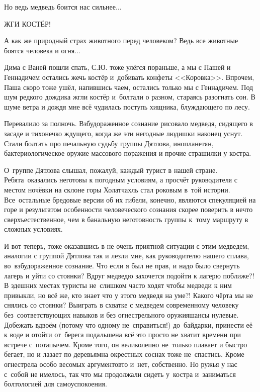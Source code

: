 \diagdash Но ведь медведь боится нас сильнее$\ldots$  

\diagdash ЖГИ КОСТЁР! 

\diagdash А как же природный страх животного перед человеком? Ведь все животные боятся человека и огня$\ldots$  


Дима с Ваней пошли спать, С.Ю. тоже улёгся пораньше, а мы с Пашей и Геннадичем остались жечь костёр и~добивать конфеты <<Коровка>>. Впрочем, Паша скоро тоже ушёл, напившись чаем, остались только мы с Геннадичем. Под шум редкого дождика жгли костёр и~болтали о разном, стараясь разогнать сон. В шуме ветра и дождя мне всё чудилась поступь хищника, блуждающего по лесу. 

Перевалило за полночь. Взбудораженное сознание рисовало медведя, сидящего в засаде и тихонечко ждущего, когда же эти негодные людишки наконец уснут. Стали болтать про печальную судьбу группы Дятлова, инопланетян, бактериологическое оружие массового поражения и прочие страшилки у костра. 

О~группе Дятлова слышал, пожалуй, каждый турист в нашей стране. Ребята~оказались неготовы к погодным условиям, а просчёт руководителя с местом ночёвки на склоне горы Холатчахль стал роковым в~той истории. Все~остальные бредовые версии об их гибели, конечно, являются спекуляцией на горе и результатом особенности человеческого сознания скорее поверить в нечто сверхъестественное, чем в банальную неготовность группы к~тому маршруту в сложных условиях. 

И вот теперь, тоже оказавшись в не очень приятной ситуации с этим медведем, аналогии с группой Дятлова так и лезли мне, как руководителю нашего сплава, во~взбудораженное сознание. Что если я был не прав, и надо было свернуть лагерь и уйти со стоянки? Вдруг медведю захочется подойти к лагерю поближе?! В здешних местах туристы не~слишком часто ходят чтобы медведи к ним привыкли, но всё же, кто знает что у этого медведя на уме?! Какого чёрта мы не снялись со стоянки? Выиграть в схватке с медведем современному человеку без~соответствующих навыков и без огнестрельного оружия\mdash шансы нулевые. Добежать вдвоём (потому что одному не~справиться!) до~байдарки, принести её к воде и отойти от~берега подальше\mdash на всё это просто не хватит времени при встрече с~потапычем. Кроме того, он великолепно не~только плавает и быстро бегает, но и лазает по деревьям\mdash на окрестных соснах тоже не~спастись. Кроме огнестрела особо весомых аргументов\sdash то и~нет, собственно. Но ружья у нас с~собой не имелось, так что мы продолжали сидеть у~костра и~заниматься болтологией для самоуспокоения.

